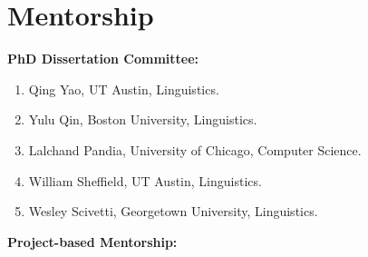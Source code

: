 \documentclass[11pt]{article}
\begin{document}
\section*{Mentorship}
\textbf{PhD Dissertation Committee:}
\begin{enumerate}
    \item Qing Yao, UT Austin, Linguistics.
    \item Yulu Qin, Boston University, Linguistics.
    \item Lalchand Pandia, University of Chicago, Computer Science.
    \item William Sheffield, UT Austin, Linguistics.
    \item Wesley Scivetti, Georgetown University, Linguistics.
\end{enumerate}
\textbf{Project-based Mentorship:}
\end{document}
